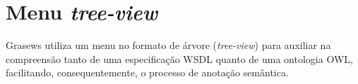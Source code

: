\section{Menu \textit{tree-view}}\label{4-grasews-menu-tree-view}

Grasews utiliza um menu no formato de árvore (\textit{tree-view}) para auxiliar na compreensão tanto de uma especificação WSDL quanto de uma ontologia OWL, facilitando, consequentemente, o processo de anotação semântica.


